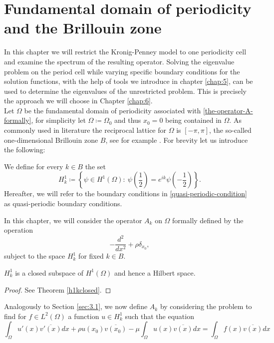 \chapter{Fundamental domain of periodicity and the Brillouin zone}  \label{chap:4}

In this chapter we will restrict the Kronig-Penney model to one periodicity cell and examine the spectrum of the resulting operator. Solving the eigenvalue problem on the period cell while varying specific boundary conditions for the solution functions, with the help of tools we introduce in chapter \ref{chap:5}, can be used to determine the eigenvalues of the unrestricted problem. This is precisely the approach we will choose in Chapter \ref{chap:6}.
~\\ 

Let $\Omega$ be the fundamental domain of periodicity associated with \eqref{the-operator-A-formally}, for simplicity let $\Omega \coloneqq \Omega_{0}$ and thus $x_{0} = 0$ being contained in $\Omega$. As commonly used in literature the reciprocal lattice for $\Omega$ is $[-\pi, \pi]$, the so-called one-dimensional Brillouin zone $B$, see for example \cite[chapter 3]{dorfler2011photonic}. For brevity let us introduce the following:
\begin{definition} 
	We define for every $k \in B$ the set  
	\begin{equation} 
		H^{1}_{k} \coloneqq \left\{ \psi \in H^{1}(\Omega): ~ \psi\left(\frac{1}{2}\right) = e^{ik} \psi\left(-\frac{1}{2}\right) \right\}. \label{quasi-periodic-condition}
	\end{equation}
	Hereafter, we will refer to the boundary conditions in \eqref{quasi-periodic-condition} as quasi-periodic boundary conditions.
\end{definition}
In this chapter, we will consider the operator $A_{k}$ on $\Omega$ formally defined by the operation 
	\[ -\frac{d^{2}}{dx^{2}} + \rho \delta_{x_{0}}, \]
subject to the space $H^{1}_{k}$ for fixed $k \in B$.
	
\begin{remark}
	$H^{1}_{k}$ is a closed subspace of $H^{1}(\Omega)$ and hence a Hilbert space.
\end{remark}

\begin{proof}
	See Theorem \ref{h1kclosed}.
\end{proof}

Analogously to Section \ref{sec:3.1}, we now define $A_{k}$ by considering the problem to find for $f \in L^{2}(\Omega)$ a function $u \in H^{1}_{k}$ such that the equation
	\begin{equation}
		\int_{\Omega} u'(x) \overline{v'(x)} dx + \rho u(x_{0}) \overline{v(x_{0})} - \mu \int_{\Omega} u(x) \overline{v(x)} dx = \int_{\Omega} f(x) \overline{v(x)} dx \label{weak-formulation-to-the-restricted}
	\end{equation}

